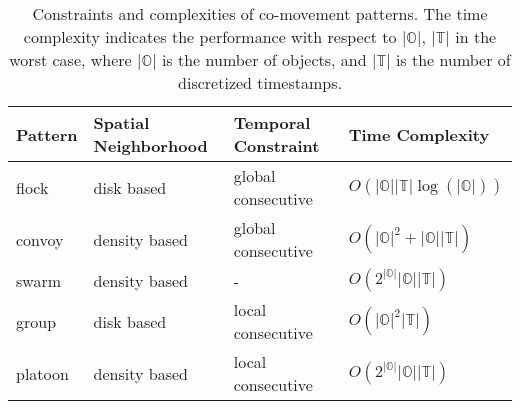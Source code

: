 
\begin{table}[h]
\centering
\caption{Constraints and complexities of co-movement patterns. The time complexity indicates the performance with respect to
$|\mathbb{O}|$, $|\mathbb{T}|$ in the worst case, where $|\mathbb{O}|$ is the number of objects, and $|\mathbb{T}|$ is the number of discretized timestamps.}\label{tbl:existing_co_patterns}
\begin{tabular}{|l|l|l|l|}
\hline 
\textbf{Pattern} & {\textbf{Spatial Neighborhood}} & { \textbf{Temporal Constraint}} & { \textbf{Time Complexity}}\\ 
\hline 
flock~\cite{gudmundsson2006computing} & disk based &  global consecutive & {$O(|\mathbb{O}||\mathbb{T}|\log(|\mathbb{O}|))$} \\ 
\hline 
convoy~\cite{jeung2008discovery} & density  based&   global consecutive & {$O(|\mathbb{O}|^2+|\mathbb{O}||\mathbb{T}|)$}\\ 
\hline 
swarm~\cite{li2010swarm} & density based & - & {$O(2^{|\mathbb{O}|}|\mathbb{O}||\mathbb{T}|)$}  \\ 
\hline 
group~\cite{wang2006grouppattern} & disk based &  local consecutive & {$O(|\mathbb{O}|^2|\mathbb{T}|)$}\\ 
\hline 
platoon~\cite{li2015platoon} & density based &  local consecutive & {$O(2^{|\mathbb{O}|}|\mathbb{O}||\mathbb{T}|)$}\\ 
\hline 
\end{tabular} 
\end{table}

